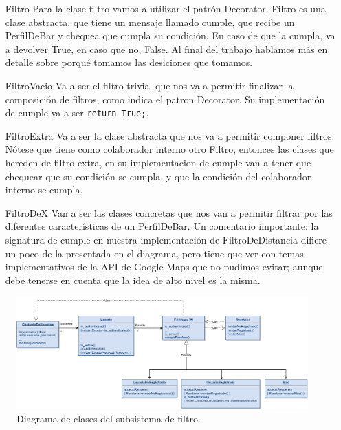 \begin{itemize}
\item[Filtro] Para la clase filtro vamos a utilizar el patrón Decorator. Filtro es una clase abstracta, que tiene un mensaje llamado cumple, que recibe un PerfilDeBar y chequea que cumpla su condición. En caso de que la cumpla, va a devolver True, en caso que no, False. Al final del trabajo hablamos más en detalle sobre porqu\'e tomamos las desiciones que tomamos.

\item[FiltroVacio] Va a ser el filtro trivial que nos va a permitir finalizar la composición de filtros, como indica el patron Decorator. Su implementación de cumple va a ser \texttt{return True;}.

\item[FiltroExtra] Va a ser la clase abstracta que nos va a permitir componer filtros. Nótese que tiene como colaborador interno otro Filtro, entonces las clases que hereden de filtro extra, en su implementacion de cumple van a tener que chequear que su condición se cumpla, y que la condición del colaborador interno se cumpla.

\item[FiltroDeX] Van a ser las clases concretas que nos van a permitir filtrar por las diferentes características de un PerfilDeBar. Un comentario importante: la signatura de cumple en nuestra implementación de FiltroDeDistancia difiere un poco de la presentada en el diagrama, pero tiene que ver con temas implementativos de la API de Google Maps que no pudimos evitar; aunque debe tenerse en cuenta que la idea de alto nivel es la misma.
\end{itemize}

\begin{figure}[H]
  \centering
  \includegraphics[width=\textwidth]{diagramas/usuario_clases.png}
  \caption{\normalfont Diagrama de clases del subsistema de filtro.}
\end{figure}

